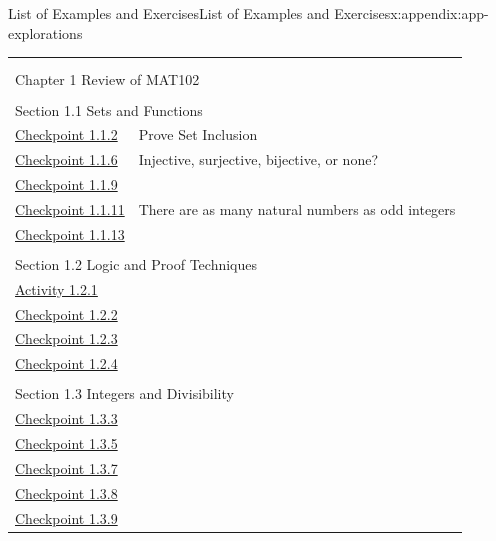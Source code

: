 \documentclass[oneside,10pt,]{book}
\numberwithin{equation}{section}
\begin{document}
\begin{appendixptx}{List of Examples and Exercises}{}{List of Examples and Exercises}{}{}{x:appendix:app-explorations}
\noindent
\begin{longtable}[l]{ll}
\addtocounter{table}{-1}
\endfirsthead
\endhead
\multicolumn{2}{r}{(Continued on next page)}\\
\endfoot
\endlastfoot
\multicolumn{2}{l}{\null}\\[1.5ex] \multicolumn{2}{l}{\large Chapter 1 Review of MAT102}\\[0.5ex]
\multicolumn{2}{l}{\null}\\[1.5ex] \multicolumn{2}{l}{\large Section 1.1 Sets and Functions}\\[0.5ex]
\hyperref[x:exercise:exe-review-set-inclusion]{Checkpoint 1.1.2}& Prove Set Inclusion\\
\hyperref[g:exercise:id483282]{Checkpoint 1.1.6}& Injective, surjective, bijective, or none?\\
\hyperref[g:exercise:id483459]{Checkpoint 1.1.9}& \\
\hyperref[g:exercise:id483642]{Checkpoint 1.1.11}& There are as many natural numbers as odd integers\\
\hyperref[g:exercise:id483855]{Checkpoint 1.1.13}& \\
\multicolumn{2}{l}{\null}\\[1.5ex] \multicolumn{2}{l}{\large Section 1.2 Logic and Proof Techniques}\\[0.5ex]
\hyperref[x:activity:exe-review-proofs]{Activity 1.2.1}& \\
\hyperref[x:exercise:exe-review-induction]{Checkpoint 1.2.2}& \\
\hyperref[x:exercise:exe-review-induction-fibonacci]{Checkpoint 1.2.3}& \\
\hyperref[x:exercise:exe-review-induction-tiling]{Checkpoint 1.2.4}& \\
\multicolumn{2}{l}{\null}\\[1.5ex] \multicolumn{2}{l}{\large Section 1.3 Integers and Divisibility}\\[0.5ex]
\hyperref[x:exercise:exe-review-division-algorithm]{Checkpoint 1.3.3}& \\
\hyperref[x:exercise:exe-review-gcd]{Checkpoint 1.3.5}& \\
\hyperref[x:exercise:ex-review-bezout]{Checkpoint 1.3.7}& \\
\hyperref[x:exercise:ex-review-bezout-no-solution]{Checkpoint 1.3.8}& \\
\hyperref[x:exercise:ex-review-bezout-gcd]{Checkpoint 1.3.9}& \\

\end{longtable}
\end{appendixptx}
\end{document}
